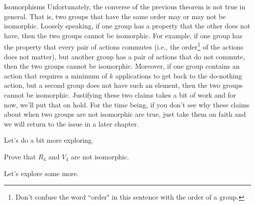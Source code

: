 \begin{section}{Isomorphisms}
Unfortunately, the converse of the previous theorem is not true in general.  That is, two groups that have the same order may or may not be isomorphic.  Loosely speaking, if one group has a property that the other does not have, then the two groups cannot be isomorphic.  For example, if one group has the property that every pair of actions commutes (i.e., the order\footnote{Don't confuse the word ``order" in this sentence with the order of a group.} of the actions does not matter), but another group has a pair of actions that do not commute, then the two groups cannot be isomorphic.  Moreover, if one group contains an action that requires a minimum of $k$ applications to get back to the do-nothing action, but a second group does not have such an element, then the two groups cannot be isomorphic.  Justifying these two claims takes a bit of work and for now, we'll put that on hold.  For the time being, if you don't see why these claims about when two groups are not isomorphic are true, just take them on faith and we will return to the issue in a later chapter.

Let's do a bit more exploring.

\begin{problem}
Prove that $R_4$ and $V_4$ are not isomorphic.
\end{problem}

Let's explore some more.

\end{section}